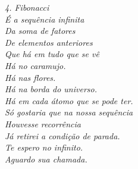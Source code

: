 \clearpage
\thispagestyle{empty}

\vspace*{\fill}

\begin{flushright}
    \itshape
    4. Fibonacci \\[0.5cm]

    É a sequência infinita \\
    Da soma de fatores \\
    De elementos anteriores \\
    Que há em tudo que se vê \\[\baselineskip]
    Há no caramujo. \\
    Há nas flores. \\
    Há na borda do universo. \\
    Há em cada átomo que se pode ter. \\[\baselineskip]
    Só gostaria que na nossa sequência \\
    Houvesse recorrência \\ \relax
    [recursiva \\
    Para que da nossa soma pudesse resultar \\
    Uma sequência única. Singular. \\[\baselineskip]
    Já retirei a condição de parada. \\
    Te espero no infinito. \\
    Aguardo sua chamada.
\end{flushright}

\clearpage

